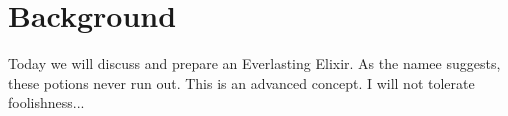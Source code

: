 \section{Background}
\label{sec:background}

Today we will discuss and prepare an Everlasting Elixir. As the namee suggests, these potions never run out. This is an advanced concept. I will not tolerate foolishness...
